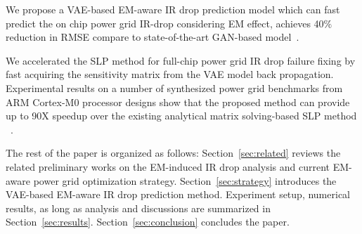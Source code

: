 \begin{itemlist}
\item We propose a VAE-based EM-aware IR drop prediction model which can fast predict the on chip power grid IR-drop considering EM effect, achieves 40$\%$ reduction in RMSE compare to state-of-the-art GAN-based model~\cite{ZhouJin:ICCAD'20}.

\item We accelerated the SLP method for full-chip power grid IR drop failure fixing by fast acquiring the sensitivity matrix from the VAE model back propagation. 
Experimental results on a number of synthesized power grid benchmarks from ARM Cortex-M0 processor designs show that the proposed method can provide up to 90X speedup over the existing analytical matrix solving-based SLP method ~\cite{Sukharev:2019pg}.
 
\end{itemlist}

The rest of the paper is organized as follows:
Section~\ref{sec:related} reviews the related preliminary works on the
EM-induced IR drop analysis and current EM-aware power grid
optimization strategy. Section~\ref{sec:strategy} introduces the
VAE-based EM-aware IR drop prediction method. Experiment setup, numerical results, as long as
analysis and discussions are summarized in Section~\ref{sec:results}.
Section~\ref{sec:conclusion} concludes the paper.
